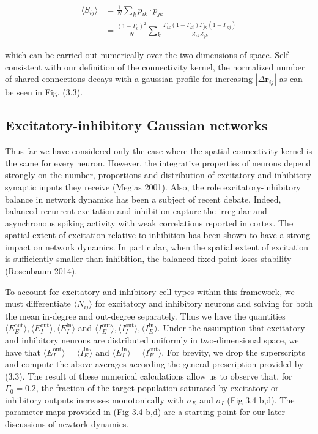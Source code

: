 \documentclass{ucetd}
\begin{document}
\begin{align}
\langle S_{ij} \rangle &= \frac{1}{N}\sum_{k} p_{ik}\cdot p_{jk} \\
&= \frac{\left(1-\Gamma_{0}\right)^{2}}{N}\sum_{k}\frac{\Gamma_{ik}(1-\Gamma_{ki})\Gamma_{jk}(1-\Gamma_{kj})}{Z_{ik}Z_{jk}}
\end{align}


which can be carried out numerically over the two-dimensions of space. Self-consistent with our definition of the connectivity kernel, the normalized number of shared connections decays with a gaussian profile for increasing $|\Delta \mathbf{r}_{ij}|$ as can be seen in Fig. (3.3).

\subsection{Excitatory-inhibitory Gaussian networks}

Thus far we have considered only the case where the spatial connectivity kernel is the same for every neuron. However, the integrative properties of neurons depend strongly on the number, proportions and distribution of excitatory and inhibitory synaptic inputs they receive (Megias 2001). Also, the role excitatory-inhibitory balance in network dynamics has been a subject of recent debate. Indeed, balanced recurrent excitation and inhibition capture the irregular and asynchronous spiking activity with weak correlations reported in cortex. The spatial extent of excitation relative to inhibition has been shown to have a strong impact on network dynamics. In particular, when the spatial extent of excitation is sufficiently smaller than inhibition, the balanced fixed point loses stability (Rosenbaum 2014). 

To account for excitatory and inhibitory cell types within this framework, we must differentiate $\langle N_{ij}\rangle$ for excitatory and inhibitory neurons and solving for both the mean in-degree and out-degree separately. Thus we have the quantities $\langle E_{E}^{\mathrm{out}} \rangle,\langle E_{I}^{\mathrm{out}} \rangle,\langle E_{I}^{\mathrm{in}} \rangle$ and $\langle I_{E}^{\mathrm{out}} \rangle,\langle I_{I}^{\mathrm{out}} \rangle,\langle I_{E}^{\mathrm{in}} \rangle$. Under the assumption that excitatory and inhibitory neurons are distributed uniformly  in two-dimensional space, we have that $\langle E_{I}^{\mathrm{out}} \rangle = \langle I_{E}^{\mathrm{in}} \rangle$ and $\langle E_{I}^{\mathrm{in}} \rangle = \langle I_{E}^{\mathrm{out}}\rangle$. For brevity, we drop the superscripts and compute the above averages according the general prescription provided by (3.3). The result of these numerical calculations allow us to observe that, for $\Gamma_{0} = 0.2$, the fraction of the target population saturated by excitatory or inhibitory outputs increases monotonically with $\sigma_{E}$ and $\sigma_{I}$  (Fig 3.4 b,d). The parameter maps provided in (Fig 3.4 b,d) are a starting point for our later discussions of newtork dynamics. 
\end{document}
